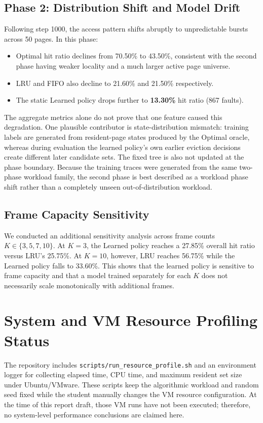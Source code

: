 \documentclass[10pt,twocolumn,a4paper]{article}
\begin{document}
\subsection{Phase 2: Distribution Shift and Model Drift}
Following step 1000, the access pattern shifts abruptly to unpredictable bursts across 50 pages. In this phase:
\begin{itemize}
    \item Optimal hit ratio declines from 70.50\% to 43.50\%, consistent with the second phase having weaker locality and a much larger active page universe.
    \item LRU and FIFO also decline to 21.60\% and 21.50\% respectively.
    \item The static Learned policy drops further to \textbf{13.30\%} hit ratio (867 faults).
\end{itemize}
The aggregate metrics alone do not prove that one feature caused this degradation. One plausible contributor is state-distribution mismatch: training labels are generated from resident-page states produced by the Optimal oracle, whereas during evaluation the learned policy's own earlier eviction decisions create different later candidate sets. The fixed tree is also not updated at the phase boundary. Because the training traces were generated from the same two-phase workload family, the second phase is best described as a workload phase shift rather than a completely unseen out-of-distribution workload.

\subsection{Frame Capacity Sensitivity}
We conducted an additional sensitivity analysis across frame counts $K \in \{3, 5, 7, 10\}$. At $K=3$, the Learned policy reaches a 27.85\% overall hit ratio versus LRU's 25.75\%. At $K=10$, however, LRU reaches 56.75\% while the Learned policy falls to 33.60\%. This shows that the learned policy is sensitive to frame capacity and that a model trained separately for each $K$ does not necessarily scale monotonically with additional frames.

\section{System and VM Resource Profiling Status}
The repository includes \texttt{scripts/run\_resource\_profile.sh} and an environment logger for collecting elapsed time, CPU time, and maximum resident set size under Ubuntu/VMware. These scripts keep the algorithmic workload and random seed fixed while the student manually changes the VM resource configuration. At the time of this report draft, those VM runs have not been executed; therefore, no system-level performance conclusions are claimed here.
\end{document}
